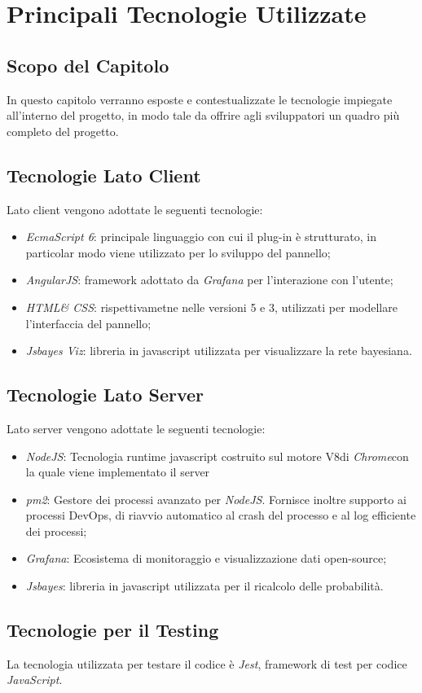 \section{Principali Tecnologie Utilizzate}\label{tecnologie}
\subsection{Scopo del Capitolo}
In questo capitolo verranno esposte e contestualizzate le tecnologie impiegate all'interno del progetto, in modo tale da offrire agli sviluppatori un quadro più completo del progetto.

\subsection{Tecnologie Lato Client}\label{clientTec}
Lato client vengono adottate le seguenti tecnologie:
\begin{itemize}
	\item \textit{EcmaScript 6}\glossario: principale linguaggio con cui il plug-in è strutturato, in particolar modo viene utilizzato per lo sviluppo del pannello;
	\item \textit{AngularJS}\glossario: framework adottato da \textit{Grafana} per l'interazione con l'utente;
	\item \textit{HTML\glossario \& CSS\glossario}: rispettivametne nelle versioni 5 e 3, utilizzati per modellare l'interfaccia del pannello;
	\item \textit{Jsbayes Viz}\glossario: libreria in javascript utilizzata per visualizzare la rete bayesiana.
\end{itemize}

\subsection{Tecnologie Lato Server}\label{serverTec}
Lato server vengono adottate le seguenti tecnologie:
\begin{itemize}
	\item \textit{NodeJS}\glossario: Tecnologia runtime javascript costruito sul motore V8\glossario di \textit{Chrome}\glossario con la quale viene implementato il server 
	\item \textit{pm2}: Gestore dei processi avanzato per \textit{NodeJS}. Fornisce inoltre supporto ai processi DevOps\glossario , di riavvio automatico al crash del processo e al log efficiente dei processi;
	\item \textit{Grafana}: Ecosistema di monitoraggio e visualizzazione dati open-source;
	\item \textit{Jsbayes}\glossario: libreria in javascript utilizzata per il ricalcolo delle probabilità.
\end{itemize}

\subsection{Tecnologie per il Testing}\label{testTec}
La tecnologia utilizzata per testare il codice è \textit{Jest}\glossario, framework di test per codice \textit{JavaScript}.